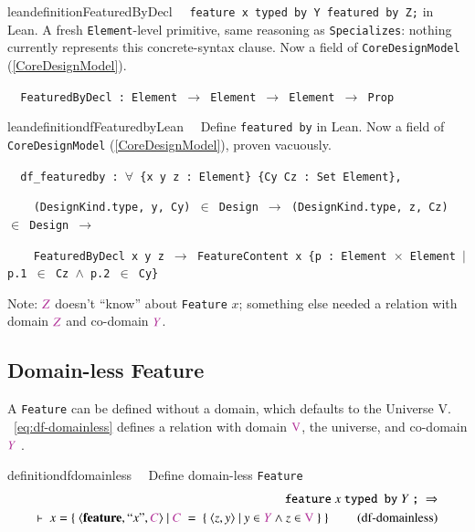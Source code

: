 \begin{restatable}{leandefinition}{FeaturedByDecl}~~ \texttt{feature x typed by Y featured
by Z;} in Lean. A fresh \texttt{Element}-level primitive, same reasoning as \texttt{Specializes}: nothing
currently represents this concrete-syntax clause. Now a field of \texttt{CoreDesignModel} (\ref{CoreDesignModel}).

\texttt{~~FeaturedByDecl : Element $\to$ Element $\to$ Element $\to$ Prop}
\label{FeaturedByDecl}
\end{restatable}

\begin{restatable}{leandefinition}{dfFeaturedbyLean}~~ Define \texttt{featured by} in Lean.
Now a field of \texttt{CoreDesignModel} (\ref{CoreDesignModel}), proven vacuously.

\texttt{~~df\_featuredby : $\forall$ \{x y z : Element\} \{Cy Cz : Set Element\},}

\texttt{~~~~(DesignKind.type, y, Cy) $\in$ Design $\to$ (DesignKind.type, z, Cz) $\in$ Design $\to$}

\texttt{~~~~FeaturedByDecl x y z $\to$ FeatureContent x \{p : Element $\times$ Element $\vert$ p.1 $\in$ Cz $\wedge$ p.2 $\in$ Cy\}}
\label{df_featuredby}
\end{restatable}

Note:  $\mc{Z}$ doesn't ``know'' about \texttt{Feature} $x$; something else needed a relation with domain $\mc{Z}$ and co-domain $\mc{Y}$.


\subsection{Domain-less Feature}  

\pn A \texttt{Feature} can be defined without a domain, which defaults to the Universe $\mathrm{V}$.  
~\ref{eq:df-domainless} defines a relation with domain $\mc{\mathrm{V}}$, the universe, and co-domain $\mc{Y}$ .


\begin{restatable}{definition}{dfdomainless}~~   Define domain-less \texttt{Feature}
\begin{align}
\texttt{feature}~x~\texttt{typed by}~ Y ~\texttt{;}~\Rightarrow  \notag \\
\vdash~x=\{~\langle \textbf{feature},``x",\mc{C}\rangle~\vert~\mc{C}~=~\{~\langle z,y\rangle~\vert~y \in \mc{Y} \wedge z \in \mc{\mathrm{V}}~\}~\}~\label{eq:df-domainless}\tag{df-domainless}
\end{align}
\end{restatable}

